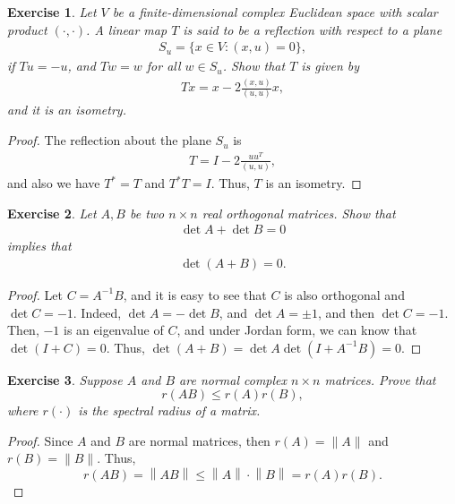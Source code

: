 \documentclass[11pt]{book}
\newtheorem{exercise}{Exercise}[section]
\theoremstyle{definition}
\numberwithin{equation}{chapter}
\begin{document}
\begin{exercise}
Let $V$ be a finite-dimensional complex Euclidean space with scalar product $(\cdot, \cdot)$. A linear map $T$ is said to be a reflection with respect to a plane
\begin{align*}
    S_u = \{x \in V: (x,u) = 0\},
\end{align*}
if $Tu = -u$, and $Tw = w$ for all $w \in S_u$. Show that $T$ is given by 
\begin{align*}
    Tx = x - 2 \frac{(x,u)}{(u,u)}x,
\end{align*}
and it is an isometry.
\end{exercise}
\begin{proof}
The reflection about the plane $S_u$ is 
\begin{align*}
    T = I - 2\frac{uu^T}{(u,u)},
\end{align*}
and also we have $T^* = T$ and $T^*T = I$. Thus, $T$ is an isometry.
\end{proof}

\medskip

\begin{exercise}
Let $A, B$ be two $n \times n$ real orthogonal matrices. Show that
\begin{align*}
    \det A + \det B = 0
\end{align*}
implies that 
\begin{align*}
    \det (A + B) = 0.
\end{align*}
\end{exercise}
\begin{proof}
Let $C = A^{-1}B$, and it is easy to see that $C$ is also orthogonal and $\det C = -1$. Indeed, $\det A = - \det B$, and $\det A = \pm 1$, and then $\det C = -1$. Then, $-1$ is an eigenvalue of $C$, and under Jordan form, we can know that $\det (I + C) = 0$. Thus, $\det (A + B) = \det A \det (I + A^{-1}B) = 0$.
\end{proof}

\medskip

\begin{exercise}
Suppose $A$ and $B$ are normal complex $n \times n$ matrices. Prove that
$$r(AB) \leq r(A) r(B),$$
where $r(\cdot)$ is the spectral radius of a matrix.
\end{exercise}
\begin{proof}
Since $A$ and $B$ are normal matrices, then $r(A) = \|A\|$ and $r(B) = \|B\|$. Thus, 
$$r(AB) = \left\|AB\right\| \leq \left\|A\right\| \cdot \left\|B\right\| = r(A) r(B).$$
\end{proof}
\end{document}
